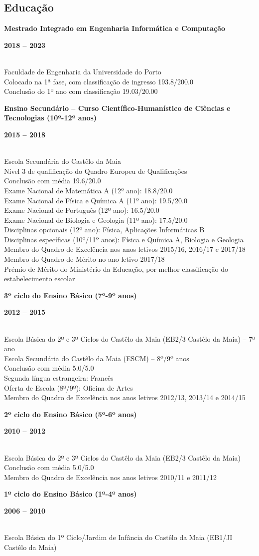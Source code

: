 \documentclass[8pt]{extarticle}
\newcommand{\parag}[1]{
\begin{minipage}{\textwidth} \hfill
\begin{minipage}{\dimexpr\textwidth-0.6cm}
	#1
\end{minipage}
\end{minipage}
}
\newcommand{\itemtime}[2]{
#1 \hfill \begin{minipage}[t]{0.185\textwidth}         #2  \end{minipage}
}
\newcommand{\job}[3]{\parag{
\itemtime{\textbf{#1}}{\textbf{#2}}\\
#3 \vspace*{9px}}}
\begin{document}
\subsection*{Educação}
\job{Mestrado Integrado em Engenharia Informática e Computação}{2018 – 2023}{
Faculdade de Engenharia da Universidade do Porto\\
Colocado na 1ª fase, com classificação de ingresso 193.8/200.0\\
Conclusão do 1º ano com classificação 19.03/20.00
}
\job{Ensino Secundário – Curso Científico-Humanístico de Ciências e Tecnologias (10º-12º anos)}{2015 – 2018}{
Escola Secundária do Castêlo da Maia\\
Nível 3 de qualificação do Quadro Europeu de Qualificações\\
Conclusão com média 19.6/20.0\\
Exame Nacional de Matemática A (12º ano): 18.8/20.0\\
Exame Nacional de Física e Química A (11º ano): 19.5/20.0\\
Exame Nacional de Português (12º ano): 16.5/20.0\\
Exame Nacional de Biologia e Geologia (11º ano): 17.5/20.0\\
Disciplinas opcionais (12º ano): Física, Aplicações Informáticas B\\
Disciplinas específicas (10º/11º anos): Física e Química A, Biologia e Geologia\\
Membro do Quadro de Excelência nos anos letivos 2015/16, 2016/17 e 2017/18\\
Membro do Quadro de Mérito no ano letivo 2017/18\\
Prémio de Mérito do Ministério da Educação, por melhor classificação do estabelecimento escolar
}
\job{3º ciclo do Ensino Básico (7º-9º anos)}{2012 – 2015}{
Escola Básica do 2º e 3º Ciclos do Castêlo da Maia (EB2/3 Castêlo da Maia) – 7º ano\\
Escola Secundária do Castêlo da Maia (ESCM) – 8º/9º anos\\
Conclusão com média 5.0/5.0\\
Segunda língua estrangeira: Francês\\
Oferta de Escola (8º/9º): Oficina de Artes\\
Membro do Quadro de Excelência nos anos letivos 2012/13, 2013/14 e 2014/15
}
\job{2º ciclo do Ensino Básico (5º-6º anos)}{2010 – 2012}{
Escola Básica do 2º e 3º Ciclos do Castêlo da Maia (EB2/3 Castêlo da Maia)\\
Conclusão com média 5.0/5.0\\
Membro do Quadro de Excelência nos anos letivos 2010/11 e 2011/12
}
\job{1º ciclo do Ensino Básico (1º-4º anos)}{2006 – 2010}{
Escola Básica do 1º Ciclo/Jardim de Infância do Castêlo da Maia (EB1/JI Castêlo da Maia)
}
\end{document}
